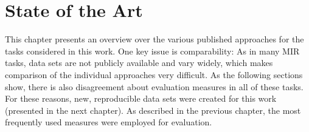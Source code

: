 

\chapter{State of the Art}	\label{chap:sota}
This chapter presents an overview over the various published approaches for the tasks considered in this work. One key issue is comparability: As in many MIR tasks, data sets are not publicly available and vary widely, which makes  comparison of the individual approaches very difficult. As the following sections show, there is also disagreement about evaluation measures in all of these tasks.\\
For these reasons, new, reproducible data sets were created for this work (presented in the next chapter). As described in the previous chapter, the most frequently used measures were employed for evaluation.


